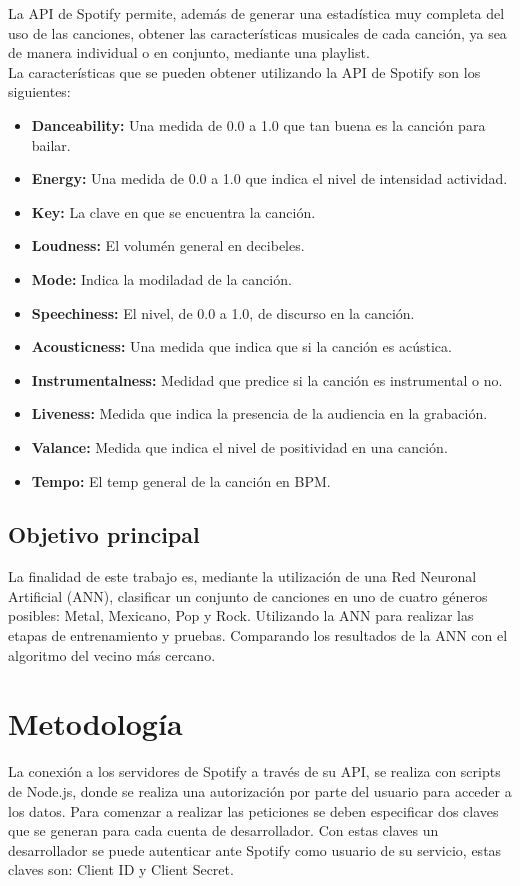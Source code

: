 \documentclass[conference]{IEEEtran}
\begin{document}
La API de Spotify permite, además de generar una estadística muy completa del uso de las canciones, obtener las características musicales de cada canción, ya sea de manera individual o en conjunto, mediante una playlist.\\
La características que se pueden obtener utilizando la API de Spotify son los siguientes: \\

\begin{itemize}
	\item \textbf{Danceability:} Una medida de 0.0 a 1.0 que tan buena es la canción para bailar.
	\item \textbf{Energy:} Una medida de 0.0 a 1.0 que indica el nivel de intensidad actividad.
	\item \textbf{Key:} La clave en que se encuentra la canción.
	\item \textbf{Loudness:} El volumén general en decibeles.
	\item \textbf{Mode:} Indica la modiladad de la canción.
	\item \textbf{Speechiness:} El nivel, de 0.0 a 1.0, de discurso en la canción.
	\item \textbf{Acousticness:} Una medida que indica que si la canción es acústica.
	\item \textbf{Instrumentalness:} Medidad que predice si la canción es instrumental o no.
	\item \textbf{Liveness:} Medida que indica la presencia de la audiencia en la grabación.
	\item \textbf{Valance:} Medida que indica el nivel de positividad en una canción.
	\item \textbf{Tempo:} El temp general de la canción en BPM.  \\
\end{itemize}

\subsection{Objetivo principal}
La finalidad de este trabajo es, mediante la utilización de una Red Neuronal Artificial (ANN), clasificar un conjunto de canciones en uno de cuatro géneros posibles: Metal, Mexicano, Pop y Rock. Utilizando la ANN para realizar las etapas de entrenamiento y pruebas. Comparando los resultados de la ANN con el algoritmo del vecino más cercano.\\

\section{Metodolog\'ia}
La conexión a los servidores de Spotify a través de su API, se realiza con scripts de Node.js, donde se realiza una autorización por parte del usuario para acceder a los datos. Para comenzar a realizar las peticiones se deben especificar dos claves que se generan para cada cuenta de desarrollador. Con estas claves un desarrollador se puede autenticar ante Spotify como usuario de su servicio, estas claves son: Client ID y Client Secret.\\
\end{document}
